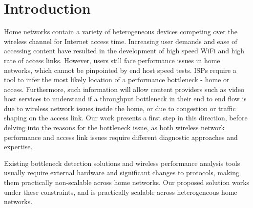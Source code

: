 \section{Introduction}

Home networks contain a variety of heterogeneous devices competing over the wireless channel for Internet access time. Increasing user demands and ease of accessing content have resulted in the development of high speed WiFi and high rate of access links. However, users still face performance issues in home networks, which cannot be pinpointed by end host speed tests. ISPs require a tool to infer the most likely location of a performance bottleneck - home or access. Furthermore, such information will allow content providers such as video host services to understand if a throughput bottleneck in their end to end flow is due to wireless network issues inside the home, or due to congestion or traffic shaping on the access link. Our work presents a first step in this direction, before delving into the reasons for the bottleneck issue, as both wireless network performance and access link issues require different diagnostic approaches and expertise.



Existing bottleneck detection solutions and wireless performance analysis tools usually require external hardware and significant changes to protocols, making them practically non-scalable across home networks. Our proposed solution works under these constraints, and is practically scalable across heterogeneous home networks.

